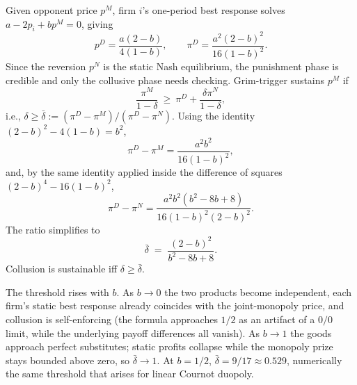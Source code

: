 \documentclass[11pt]{article}
\begin{document}
Given opponent price $p^M$, firm $i$'s one-period best response solves $a - 2p_i + b p^M = 0$, giving
\[
p^D = \frac{a(2-b)}{4(1-b)},\qquad \pi^D = \frac{a^2(2-b)^2}{16(1-b)^2}.
\]
Since the reversion $p^N$ is the static Nash equilibrium, the punishment phase is credible and only the collusive phase needs checking. Grim-trigger sustains $p^M$ if
\[
\frac{\pi^M}{1-\delta}\ \ge\ \pi^D + \frac{\delta \pi^N}{1-\delta},
\]
i.e., $\delta \ge \bar\delta := (\pi^D - \pi^M)/(\pi^D - \pi^N)$. Using the identity $(2-b)^2 - 4(1-b) = b^2$,
\[
\pi^D - \pi^M = \frac{a^2 b^2}{16(1-b)^2},
\]
and, by the same identity applied inside the difference of squares $(2-b)^4 - 16(1-b)^2$,
\[
\pi^D - \pi^N = \frac{a^2 b^2 (b^2 - 8b + 8)}{16(1-b)^2 (2-b)^2}.
\]
The ratio simplifies to
\[
\bar\delta \;=\; \frac{(2-b)^2}{b^2 - 8b + 8}.
\]
Collusion is sustainable iff $\delta \ge \bar\delta$.

The threshold rises with $b$. As $b \to 0$ the two products become independent, each firm's static best response already coincides with the joint-monopoly price, and collusion is self-enforcing (the formula approaches $1/2$ as an artifact of a $0/0$ limit, while the underlying payoff differences all vanish). As $b \to 1$ the goods approach perfect substitutes; static profits collapse while the monopoly prize stays bounded above zero, so $\bar\delta \to 1$. At $b = 1/2$, $\bar\delta = 9/17 \approx 0.529$, numerically the same threshold that arises for linear Cournot duopoly.
\end{document}
